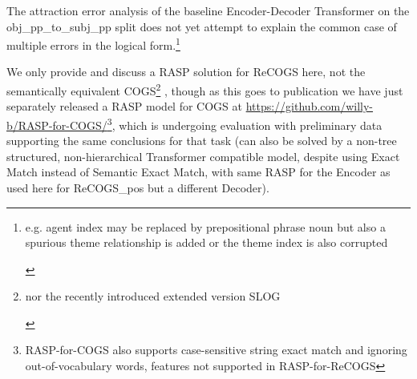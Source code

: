 \documentclass[11pt]{article}
\begin{document}
The attraction error analysis of the \citep{Wu2023} baseline Encoder-Decoder Transformer on the obj\_pp\_to\_subj\_pp split does not yet attempt to explain the common case of multiple errors in the logical form.\footnote{\begin{footnotesize}e.g. agent index may be replaced by prepositional phrase noun but also a spurious theme relationship is added or the theme index is also corrupted\end{footnotesize}}

We only provide and discuss a RASP solution for ReCOGS \citep{Wu2023} here, not the semantically equivalent COGS\footnote{\begin{footnotesize}nor the recently introduced extended version SLOG \citep{li2023slogstructuralgeneralizationbenchmark}\end{footnotesize}} \citep{KimLinzen2020}, though as this goes to publication we have just separately released a RASP model for COGS at \href{https://github.com/willy-b/RASP-for-COGS/}{https://github.com/willy-b/RASP-for-COGS/}\footnote{RASP-for-COGS also supports case-sensitive string exact match and ignoring out-of-vocabulary words, features not supported in RASP-for-ReCOGS}, which is undergoing evaluation with preliminary data supporting the same conclusions for that task (can also be solved by a non-tree structured, non-hierarchical Transformer compatible model, despite using Exact Match instead of Semantic Exact Match, with same RASP for the Encoder as used here for ReCOGS\_pos but a different Decoder).
\end{document}
